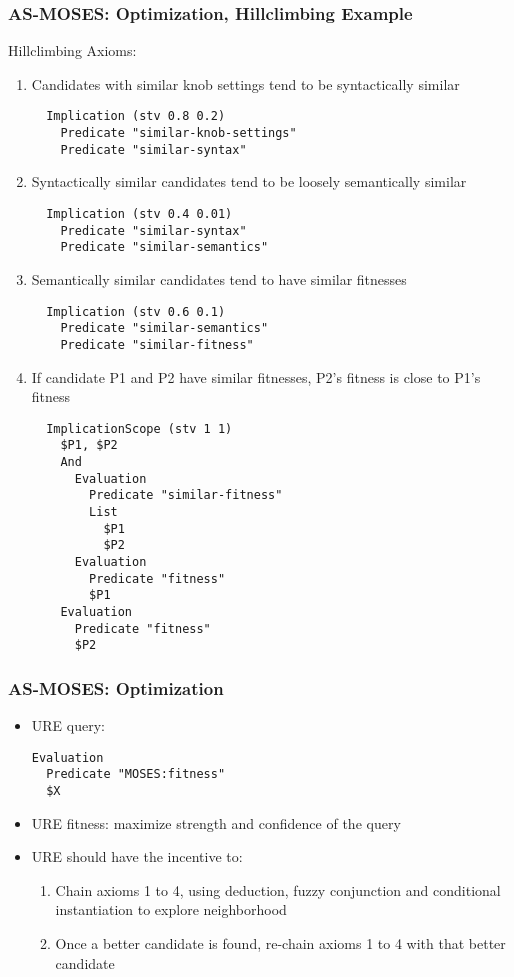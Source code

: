\documentclass{beamer}
\begin{document}
\begin{frame}[fragile]
  \frametitle{AS-MOSES: Optimization, Hillclimbing Example}

{\tiny Hillclimbing Axioms:
\begin{enumerate}
  \item Candidates with \alert{similar knob settings} tend to be
    \alert{syntactically similar}
\begin{verbatim}
  Implication (stv 0.8 0.2)
    Predicate "similar-knob-settings"
    Predicate "similar-syntax"
\end{verbatim}
  \item \alert{Syntactically similar} candidates tend to be loosely
    \alert{semantically similar}
\begin{verbatim}
  Implication (stv 0.4 0.01)
    Predicate "similar-syntax"
    Predicate "similar-semantics"
\end{verbatim}
  \item \alert{Semantically similar} candidates tend to have
    \alert{similar fitnesses}
\begin{verbatim}
  Implication (stv 0.6 0.1)
    Predicate "similar-semantics"
    Predicate "similar-fitness"
\end{verbatim}
  \item If candidate P1 and P2 have \alert{similar fitnesses},
    \alert{P2's fitness is close to P1's fitness}
\begin{verbatim}
  ImplicationScope (stv 1 1)
    $P1, $P2
    And
      Evaluation
        Predicate "similar-fitness"
        List
          $P1
          $P2
      Evaluation
        Predicate "fitness"
        $P1
    Evaluation
      Predicate "fitness"
      $P2
\end{verbatim}
  \end{enumerate}}

\end{frame}

\begin{frame}[fragile]
  \frametitle{AS-MOSES: Optimization}
  {\small

    \begin{itemize}

  \item URE query:

\begin{verbatim}
Evaluation
  Predicate "MOSES:fitness"
  $X
\end{verbatim}

\item URE fitness: \alert{maximize strength and confidence} of the
  query

  \item URE should have the incentive to:
\begin{enumerate}
\item \alert{Chain axioms 1 to 4}, using deduction, fuzzy conjunction
  and conditional instantiation to explore neighborhood
\item Once a better candidate is found, \alert{re-chain axioms 1 to 4
    with that better candidate}
\end{enumerate}
\end{itemize}
}

\end{frame}
\end{document}
